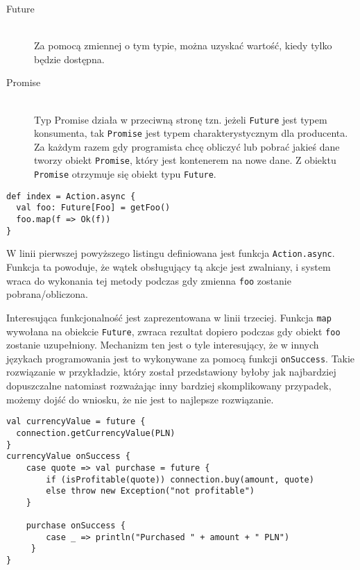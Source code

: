 \begin{description}	
	\item[Future] \hfill \\
		Za pomocą zmiennej o tym typie, można uzyskać wartość, kiedy tylko będzie dostępna.
	\item[Promise] \hfill \\
		Typ Promise działa w przeciwną stronę tzn. jeżeli \lstinline{Future} jest typem konsumenta, tak \lstinline{Promise} jest typem charakterystycznym dla producenta. Za każdym razem gdy programista chcę obliczyć lub pobrać jakieś dane tworzy obiekt \lstinline{Promise}, który jest kontenerem na nowe dane. Z obiektu \lstinline{Promise} otrzymuje się obiekt typu \lstinline{Future}.
\end{description}

\begin{lstlisting}
def index = Action.async {
  val foo: Future[Foo] = getFoo()
  foo.map(f => Ok(f))
}
\end{lstlisting}

\par

W linii pierwszej powyższego listingu definiowana jest funkcja \lstinline{Action.async}. Funkcja ta powoduje, że wątek obsługujący tą akcje jest zwalniany, i system wraca do wykonania tej metody podczas gdy zmienna \lstinline{foo} zostanie pobrana/obliczona.

\par
Interesująca funkcjonalność jest zaprezentowana w linii trzeciej. Funkcja \lstinline{map} wywołana na obiekcie \lstinline{Future}, zwraca rezultat dopiero podczas gdy obiekt \lstinline{foo} zostanie uzupełniony. Mechanizm ten jest o tyle interesujący, że w innych językach programowania jest to wykonywane za pomocą funkcji \lstinline{onSuccess}. Takie rozwiązanie w przykładzie, który został przedstawiony byłoby jak najbardziej dopuszczalne natomiast rozważając inny bardziej skomplikowany przypadek, możemy dojść do wniosku, że nie jest to najlepsze rozwiązanie.

\begin{lstlisting}
val currencyValue = future {
  connection.getCurrencyValue(PLN)
}
currencyValue onSuccess { 
	case quote => val purchase = future {
		if (isProfitable(quote)) connection.buy(amount, quote)
		else throw new Exception("not profitable")
	}
  
	purchase onSuccess {
		case _ => println("Purchased " + amount + " PLN")
	 }
}
\end{lstlisting}

